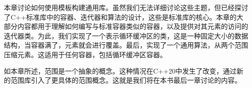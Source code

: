 本章讨论如何使用模板构建通用库。虽然我们无法详细讨论这些主题，但已经探讨了C++标准库中的容器、迭代器和算法的设计，这些是标准库的核心。本章的大部分内容都用于理解如何编写与标准容器类似的容器，以及提供对其元素的访问的迭代器类。为此，我们实现了一个表示循环缓冲区的类，这是一种固定大小的数据结构，当容器满了，元素就会进行覆盖。最后，实现了一个通用算法，从两个范围压缩元素。这适用于任何容器，包括循环缓冲区容器。

如本章所述，范围是一个抽象的概念。这种情况在C++20中发生了改变，通过新的范围库引入了更具体的范围概念。这就是我们将在本书最后一章讨论的内容。